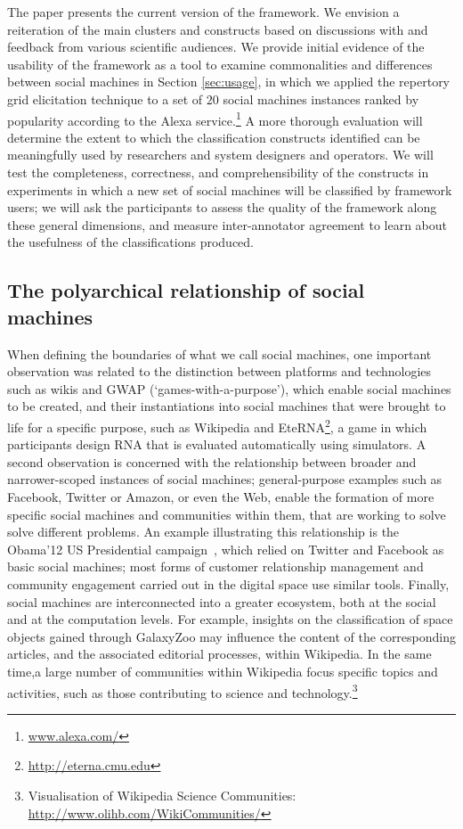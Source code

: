 \documentclass{sig-alternate}
\begin{document}
The paper presents the current version of the framework. We envision a reiteration of the main clusters and constructs based on discussions with and feedback from various scientific audiences. We provide initial evidence of the usability of the framework as a tool to examine commonalities and differences between social machines in Section \ref{sec:usage}, in which we applied the repertory grid elicitation technique to a set of $20$ social machines instances ranked by popularity according to the Alexa service.\footnote{\url{www.alexa.com/}} A more thorough evaluation will determine the extent to which the classification constructs identified can be meaningfully used by researchers and system designers and operators. We will test the completeness, correctness, and comprehensibility of the constructs in experiments in which a new set of social machines will be classified by framework users; we will ask the participants to assess the quality of the framework along these general dimensions, and measure inter-annotator agreement to learn about the usefulness of the classifications produced.

\subsection{The polyarchical relationship of social machines}
When defining the boundaries of what we call social machines, one important observation was related to the distinction between platforms and technologies such as wikis and GWAP (`games-with-a-purpose'), which enable social machines to be created, and their instantiations into social machines that were brought to life for a specific purpose, such as Wikipedia and EteRNA\footnote{\url{http://eterna.cmu.edu}}, a game in which participants design RNA that is evaluated automatically using simulators. A second observation is concerned with the relationship between broader and narrower-scoped instances of social machines; general-purpose examples such as Facebook, Twitter or Amazon, or even the Web, enable the formation of more specific social machines and communities within them, that are working to solve solve different problems. An example illustrating this relationship is the Obama'12 US Presidential campaign~\cite{obamakieron}, which relied on Twitter and Facebook as basic social machines; most forms of customer relationship management and community engagement carried out in the digital space use similar tools. Finally, social machines are interconnected into a greater ecosystem, both at the social and at the computation levels. For example, insights on the classification of space objects gained through GalaxyZoo may influence the content of the corresponding articles, and the associated editorial processes, within Wikipedia. In the same time,a large number of communities within Wikipedia focus specific topics and activities, such as those contributing to science and technology.\footnote{Visualisation of Wikipedia Science Communities: \url{http://www.olihb.com/WikiCommunities/}}
\end{document}
